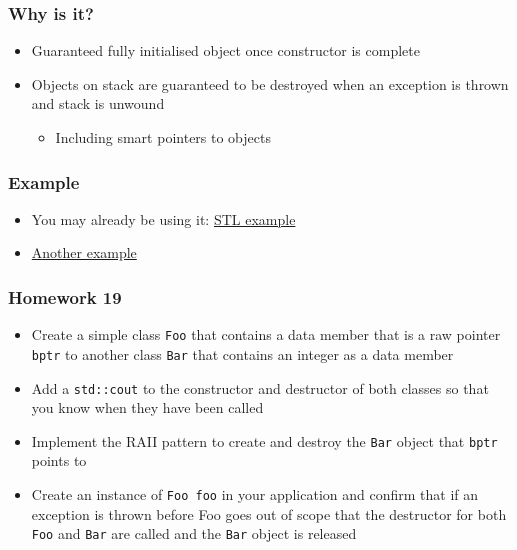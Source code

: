 \hypertarget{why-is-it}{%
\subsubsection{Why is it?}\label{why-is-it}}

\begin{itemize}
\tightlist
\item
  Guaranteed fully initialised object once constructor is complete
\item
  Objects on stack are guaranteed to be destroyed when an exception is
  thrown and stack is unwound

  \begin{itemize}
  \tightlist
  \item
    Including smart pointers to objects
  \end{itemize}
\end{itemize}

\hypertarget{example}{%
\subsubsection{Example}\label{example}}

\begin{itemize}
\tightlist
\item
  You may already be using it:
  \href{https://en.wikipedia.org/wiki/Resource_Acquisition_Is_Initialization}{STL
  example}
\item
  \href{https://en.wikibooks.org/wiki/More_C\%2B\%2B_Idioms/Resource_Acquisition_Is_Initialization}{Another
  example}
\end{itemize}

\hypertarget{homework-19-1}{%
\subsubsection{Homework 19}\label{homework-19-1}}

\begin{itemize}
\tightlist
\item
  Create a simple class \texttt{Foo} that contains a data member that is
  a raw pointer \texttt{bptr} to another class \texttt{Bar} that
  contains an integer as a data member
\item
  Add a \texttt{std::cout} to the constructor and destructor of both
  classes so that you know when they have been called
\item
  Implement the RAII pattern to create and destroy the \texttt{Bar}
  object that \texttt{bptr} points to
\item
  Create an instance of \texttt{Foo\ foo} in your application and
  confirm that if an exception is thrown before Foo goes out of scope
  that the destructor for both \texttt{Foo} and \texttt{Bar} are called
  and the \texttt{Bar} object is released
\end{itemize}

